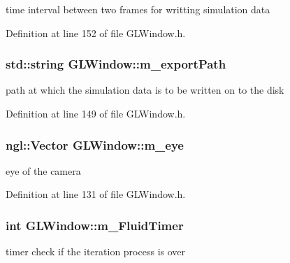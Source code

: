 time interval between two frames for writting simulation data 



Definition at line 152 of file GLWindow.h.

\hypertarget{class_g_l_window_a9beaa5fbadec281cd162d6ad0e792e94}{
\subsubsection[{m\_\-exportPath}]{\setlength{\rightskip}{0pt plus 5cm}std::string {\bf GLWindow::m\_\-exportPath}}}
\label{class_g_l_window_a9beaa5fbadec281cd162d6ad0e792e94}


path at which the simulation data is to be written on to the disk 



Definition at line 149 of file GLWindow.h.

\hypertarget{class_g_l_window_a629e95979f0bbb5306562358ca507eb8}{
\subsubsection[{m\_\-eye}]{\setlength{\rightskip}{0pt plus 5cm}ngl::Vector {\bf GLWindow::m\_\-eye}}}
\label{class_g_l_window_a629e95979f0bbb5306562358ca507eb8}


eye of the camera 



Definition at line 131 of file GLWindow.h.

\hypertarget{class_g_l_window_a1a000254ac61defca21846dbd780bbd3}{
\subsubsection[{m\_\-FluidTimer}]{\setlength{\rightskip}{0pt plus 5cm}int {\bf GLWindow::m\_\-FluidTimer}}}
\label{class_g_l_window_a1a000254ac61defca21846dbd780bbd3}


timer check if the iteration process is over 



